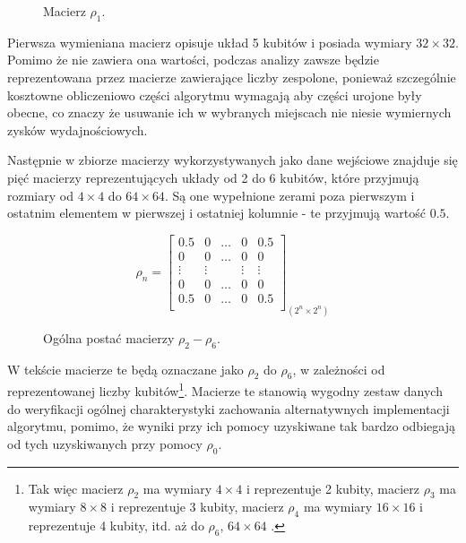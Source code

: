 \documentclass[11pt, a4paper]{article}
\begin{document}
\begin{sloppypar}
    \FloatBarrier
    \begin{figure}[ht]
      \centering
      \setcounter{MaxMatrixCols}{33}
      
      \caption{Macierz $\rho_{1}$.}
      \label{rho-1}
    \end{figure}

    \FloatBarrier

    Pierwsza wymieniana macierz opisuje układ 5 kubitów i posiada wymiary $32\times32$. Pomimo
    że nie zawiera ona wartości, podczas analizy zawsze będzie reprezentowana przez
    macierze zawierające liczby zespolone, ponieważ szczególnie kosztowne obliczeniowo części
    algorytmu wymagają aby części urojone były obecne, co znaczy że usuwanie ich w
    wybranych miejscach nie niesie wymiernych zysków wydajnościowych.

    Następnie w zbiorze macierzy wykorzystywanych jako dane wejściowe znajduje się pięć
    macierzy reprezentujących układy od 2 do 6 kubitów, które przyjmują rozmiary od $4\times
    4$ do $64\times64$. Są one wypełnione zerami poza pierwszym i ostatnim elementem w
    pierwszej i ostatniej kolumnie - te przyjmują wartość $0.5$.

    \FloatBarrier
    \begin{figure}[ht]
      \centering
      \setcounter{MaxMatrixCols}{33}
      \[
        \rho_{n}=
        \begin{bmatrix}
          0.5    & 0      & \hdots & 0      & 0.5    \\
          0      & 0      & \hdots & 0      & 0      \\
          \vdots & \vdots &        & \vdots & \vdots \\
          0      & 0      & \hdots & 0      & 0      \\
          0.5    & 0      & \hdots & 0      & 0.5    \\
        \end{bmatrix}_{(2^{n}\times2^{n})}
      \]
      \caption{Ogólna postać macierzy $\rho_{2}- \rho_{6}$.}
      \label{rho-2-6}
    \end{figure}

    \FloatBarrier

    W tekście macierze te będą oznaczane jako $\rho_{2}$ do $\rho_{6}$, w zależności od reprezentowanej
    liczby kubitów\footnote{Tak więc macierz $\rho_{2}$ ma wymiary $4\times 4$ i
    reprezentuje 2 kubity, macierz $\rho_{3}$ ma wymiary $8\times8$ i reprezentuje 3 kubity,
    macierz $\rho_{4}$ ma wymiary $16\times16$ i reprezentuje 4 kubity, itd. aż do
    $\rho_{6}$, $64\times64$ .}. Macierze te stanowią wygodny zestaw danych do weryfikacji
    ogólnej charakterystyki zachowania alternatywnych implementacji algorytmu, pomimo, że
    wyniki przy ich pomocy uzyskiwane tak bardzo odbiegają od tych uzyskiwanych przy pomocy
    $\rho_{0}$.


\end{sloppypar}
\end{document}
